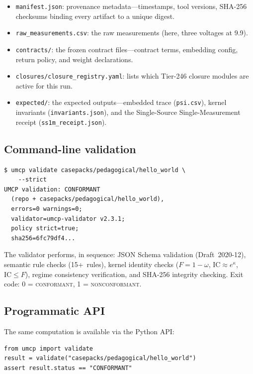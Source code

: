 \documentclass[
  aps,
  prd,
  twocolumn,
  superscriptaddress,
  nofootinbib,
  floatfix
]{revtex4-2}
\newcommand{\regime}[1]{\textrm{\upshape\scshape#1}}
\newcommand{\conform}{\regime{conformant}}
\newcommand{\nonconform}{\regime{nonconformant}}
\newcommand{\IC}{\mathrm{IC}}
\begin{document}
\begin{itemize}[leftmargin=*,nosep]
  \item \texttt{manifest.json}: provenance metadata---timestamps,
    tool versions, SHA-256 checksums binding every artifact to a
    unique digest.
  \item \texttt{raw\_measurements.csv}: the raw measurements (here,
    three voltages at 9.9).
  \item \texttt{contracts/}: the frozen contract files---contract
    terms, embedding config, return policy, and weight declarations.
  \item \texttt{closures/closure\_registry.yaml}: lists which Tier-246 closure modules are active for this run.
  \item \texttt{expected/}: the expected outputs---embedded trace
    (\texttt{psi.csv}), kernel invariants
    (\texttt{invariants.json}), and the Single-Source
    Single-Measurement receipt (\texttt{ss1m\_receipt.json}).
\end{itemize}

\subsection{Command-line validation}

\begin{Verbatim}[fontsize=\small]
$ umcp validate casepacks/pedagogical/hello_world \
    --strict
UMCP validation: CONFORMANT
  (repo + casepacks/pedagogical/hello_world),
  errors=0 warnings=0;
  validator=umcp-validator v2.3.1;
  policy strict=true;
  sha256=6fc79df4...
\end{Verbatim}

The validator performs, in sequence: JSON Schema validation
(Draft~2020-12), semantic rule checks (15+~rules), kernel identity
checks ($F = 1 - \omega$, $\IC \approx e^\kappa$, $\IC \leq F$),
regime consistency verification, and SHA-256 integrity checking.
Exit code: 0 = \conform{}, 1 = \nonconform{}.

\subsection{Programmatic API}

The same computation is available via the Python API:

\begin{Verbatim}[fontsize=\small]
from umcp import validate
result = validate("casepacks/pedagogical/hello_world")
assert result.status == "CONFORMANT"
\end{Verbatim}
\end{document}
